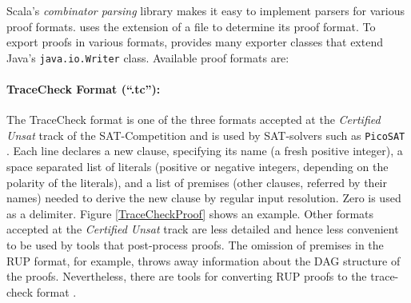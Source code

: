 \documentclass{llncs}
\newcommand{\class}[1]{\texttt{#1}}
\begin{document}
Scala's \emph{combinator parsing} library makes it easy to implement parsers for various proof formats. {\skeptik} uses the extension of a file to  determine its proof format. To export proofs in various formats, {\skeptik} provides many exporter classes that extend Java's \class{java.io.Writer} class. Available proof formats are:

\vspace{-4pt}

\paragraph{TraceCheck Format (``.tc''): }

The TraceCheck \cite{tracecheck} format is one of the three formats accepted at the \emph{Certified Unsat} track of the SAT-Competition and is used by SAT-solvers such as \texttt{PicoSAT} \cite{Biere_picosatessentials}. Each line declares a new clause, specifying its name (a fresh positive integer), a space separated list of literals (positive or negative integers, depending on the polarity of the literals), and a list of premises (other clauses, referred by their names) needed to derive the new clause by regular input resolution. Zero is used as a delimiter. Figure \ref{TraceCheckProof} shows an example.
%
Other formats accepted at the \emph{Certified Unsat} track are less detailed and hence less convenient to be used by tools that post-process proofs. The omission of premises in the RUP format, for example, throws away information about the DAG structure of the proofs. Nevertheless, there are tools for converting RUP proofs to the trace-check format \cite{DRUPTrim}.

\end{document}
